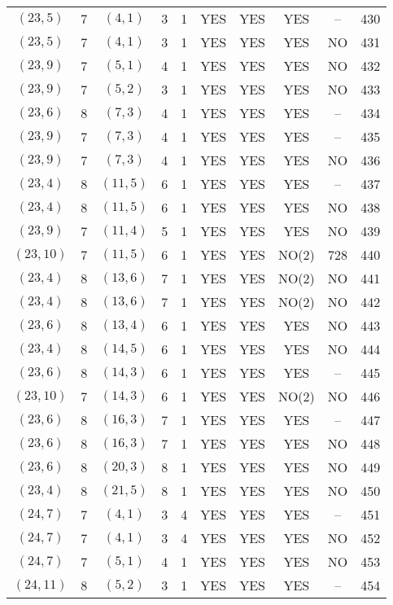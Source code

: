 \begin{longtable}{|c|c|c|c|c|c|c|c|c|c|}
$(23, 5)$ & 7 & $(4, 1)$ & 3 & 1 & YES & YES & YES & -- & 430\\
$(23, 5)$ & 7 & $(4, 1)$ & 3 & 1 & YES & YES & YES & NO & 431\\
$(23, 9)$ & 7 & $(5, 1)$ & 4 & 1 & YES & YES & YES & NO & 432\\
$(23, 9)$ & 7 & $(5, 2)$ & 3 & 1 & YES & YES & YES & NO & 433\\
$(23, 6)$ & 8 & $(7, 3)$ & 4 & 1 & YES & YES & YES & -- & 434\\
$(23, 9)$ & 7 & $(7, 3)$ & 4 & 1 & YES & YES & YES & -- & 435\\
$(23, 9)$ & 7 & $(7, 3)$ & 4 & 1 & YES & YES & YES & NO & 436\\
$(23, 4)$ & 8 & $(11, 5)$ & 6 & 1 & YES & YES & YES & -- & 437\\
$(23, 4)$ & 8 & $(11, 5)$ & 6 & 1 & YES & YES & YES & NO & 438\\
$(23, 9)$ & 7 & $(11, 4)$ & 5 & 1 & YES & YES & YES & NO & 439\\
$(23, 10)$ & 7 & $(11, 5)$ & 6 & 1 & YES & YES & NO(2) & 728 & 440\\
$(23, 4)$ & 8 & $(13, 6)$ & 7 & 1 & YES & YES & NO(2) & NO & 441\\
$(23, 4)$ & 8 & $(13, 6)$ & 7 & 1 & YES & YES & NO(2) & NO & 442\\
$(23, 6)$ & 8 & $(13, 4)$ & 6 & 1 & YES & YES & YES & NO & 443\\
$(23, 4)$ & 8 & $(14, 5)$ & 6 & 1 & YES & YES & YES & NO & 444\\
$(23, 6)$ & 8 & $(14, 3)$ & 6 & 1 & YES & YES & YES & -- & 445\\
$(23, 10)$ & 7 & $(14, 3)$ & 6 & 1 & YES & YES & NO(2) & NO & 446\\
$(23, 6)$ & 8 & $(16, 3)$ & 7 & 1 & YES & YES & YES & -- & 447\\
$(23, 6)$ & 8 & $(16, 3)$ & 7 & 1 & YES & YES & YES & NO & 448\\
$(23, 6)$ & 8 & $(20, 3)$ & 8 & 1 & YES & YES & YES & NO & 449\\
$(23, 4)$ & 8 & $(21, 5)$ & 8 & 1 & YES & YES & YES & NO & 450\\
$(24, 7)$ & 7 & $(4, 1)$ & 3 & 4 & YES & YES & YES & -- & 451\\
$(24, 7)$ & 7 & $(4, 1)$ & 3 & 4 & YES & YES & YES & NO & 452\\
$(24, 7)$ & 7 & $(5, 1)$ & 4 & 1 & YES & YES & YES & NO & 453\\
$(24, 11)$ & 8 & $(5, 2)$ & 3 & 1 & YES & YES & YES & -- & 454\\

\end{longtable}
